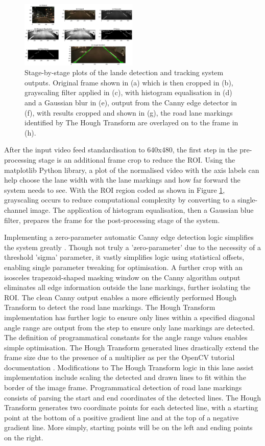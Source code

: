 \documentclass[10pt,conference]{IEEEtran}
\begin{document}
\begin{figure}[htbp]
    \centerline{\includegraphics[width=0.5\textwidth]{assets/LDS_plot.png}}
    \caption{Stage-by-stage plots of the lande detection and tracking system outputs. Original frame shown in (a) which is then cropped in (b), grayscaling filter applied in (c), with histogram equalisation in (d) and a Gaussian blur in (e), output from the Canny edge detector in (f), with results cropped and shown in (g), the road lane markings identified by The Hough Transform are overlayed on to the frame in (h).}
    \label{f2}
\end{figure}

After the input video feed standardisation to 640x480, the first step in the pre-processing stage is an additional frame crop to reduce the ROI. Using the matplotlib Python library, a plot of the normalised video with the axis labels can help choose the lane width with the lane markings and how far forward the system needs to see. With the ROI region coded as shown in Figure \ref{f2}, grayscaling occurs to reduce computational complexity by converting to a single-channel image. The application of histogram equalisation, then a Gaussian blue filter, prepares the frame for the post-processing stage of the system.

Implementing a zero-parameter automatic Canny edge detection logic simplifies the system greatly \cite{b9}. Though not truly a 'zero-parameter' due to the necessity of a threshold 'sigma' parameter, it vastly simplifies logic using statistical offsets, enabling single parameter tweaking for optimisation. A further crop with an isosceles trapezoid-shaped masking window on the Canny algorithm output eliminates all edge information outside the lane markings, further isolating the ROI. The clean Canny output enables a more efficiently performed Hough Transform to detect the road lane markings. The Hough Transform implementation has further logic to ensure only lines within a specified diagonal angle range are output from the step to ensure only lane markings are detected. The definition of programmatical constants for the angle range values enables simple optimisation. The Hough Transform generated lines drastically extend the frame size due to the presence of a multiplier as per the OpenCV tutorial documentation \cite{b10}. Modifications to The Hough Transform logic in this lane assist implementation include scaling the detected and drawn lines to fit within the border of the image frame. Programmatical detection of road lane markings consists of parsing the start and end coordinates of the detected lines. The Hough Transform generates two coordinate points for each detected line, with a starting point at the bottom of a positive gradient line and at the top of a negative gradient line. More simply, starting points will be on the left and ending points on the right.
\end{document}
